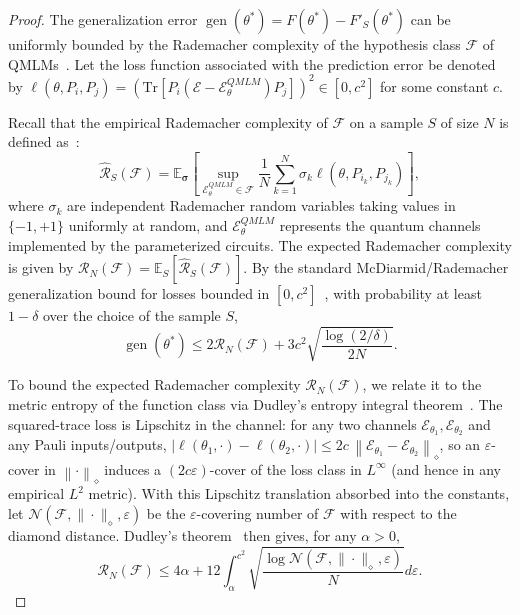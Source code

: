 \documentclass[%
 reprint,
superscriptaddress,
 amsmath,amssymb,
 aps,
]{revtex4-2}
\newcommand{\E}{\mathcal{E}}
\newcommand{\norm}[1]{\left\lVert#1\right\rVert}
\begin{document}
\begin{proof}
    The generalization error $\operatorname{gen}(\theta^*) = F(\theta^*) - F'_S(\theta^*)$ can be uniformly bounded by the Rademacher complexity of the hypothesis class $\mathcal{F}$ of QMLMs~\cite{bartlett2002rademacher,mohri2018foundations}. Let the loss function associated with the prediction error be denoted by $\ell(\theta, P_i, P_j) = \left(\mathrm{Tr}\left[P_i(\E-\E^{QMLM}_\theta)P_j\right]\right)^2 \in [0, c^2]$ for some constant $c$.

    Recall that the empirical Rademacher complexity of $\mathcal{F}$ on a sample $S$ of size $N$ is defined as~\cite{bartlett2002rademacher,mohri2018foundations}:
    \begin{equation}
        \hat{\mathcal{R}}_S(\mathcal{F}) = \mathbb{E}_{\boldsymbol{\sigma}}\left[ \sup_{\E^{QMLM}_\theta \in \mathcal{F}} \frac{1}{N} \sum_{k=1}^N \sigma_k \ell(\theta, P_{i_k}, P_{j_k}) \right],
    \end{equation}
    where $\sigma_k$ are independent Rademacher random variables taking values in $\{-1, +1\}$ uniformly at random, and $\E^{QMLM}_\theta$ represents the quantum channels implemented by the parameterized circuits. The expected Rademacher complexity is given by $\mathcal{R}_N(\mathcal{F}) = \mathbb{E}_S[\hat{\mathcal{R}}_S(\mathcal{F})]$. By the standard McDiarmid/Rademacher generalization bound for losses bounded in $[0,c^2]$~\cite{bartlett2002rademacher,mohri2018foundations}, with probability at least $1-\delta$ over the choice of the sample $S$,
    \begin{equation}
        \operatorname{gen}(\theta^*) \le 2\mathcal{R}_N(\mathcal{F}) + 3c^2\sqrt{\frac{\log(2/\delta)}{2N}}.
    \end{equation}

    To bound the expected Rademacher complexity $\mathcal{R}_N(\mathcal{F})$, we relate it to the metric entropy of the function class via Dudley's entropy integral theorem~\cite{dudley1967sizes,vershynin2018hdp}. The squared-trace loss is Lipschitz in the channel: for any two channels $\E_{\theta_1},\E_{\theta_2}$ and any Pauli inputs/outputs, $|\ell(\theta_1,\cdot)-\ell(\theta_2,\cdot)| \le 2c\,\norm{\E_{\theta_1}-\E_{\theta_2}}_\diamond$, so an $\varepsilon$-cover in $\norm{\cdot}_\diamond$ induces a $(2c\varepsilon)$-cover of the loss class in $L^\infty$ (and hence in any empirical $L^2$ metric). With this Lipschitz translation absorbed into the constants, let $\mathcal{N}(\mathcal{F}, \|\cdot\|_\diamond, \varepsilon)$ be the $\varepsilon$-covering number of $\mathcal{F}$ with respect to the diamond distance. Dudley's theorem~\cite{dudley1967sizes,vershynin2018hdp} then gives, for any $\alpha > 0$,
    \begin{equation}
        \mathcal{R}_N(\mathcal{F}) \le 4\alpha + 12 \int_{\alpha}^{c^2} \sqrt{\frac{\log \mathcal{N}\left(\mathcal{F}, \|\cdot\|_\diamond, \varepsilon\right)}{N}} d\varepsilon.
    \end{equation}
    

\end{proof}
\end{document}
